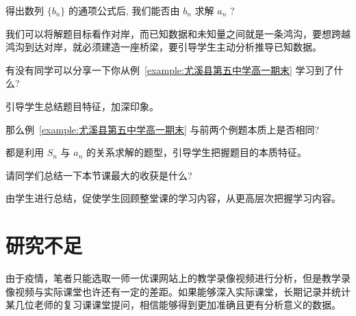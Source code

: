 \begin{question}
  得出数列 $\{b_{n}\}$ 的通项公式后, 我们能否由 $b_{n}$ 求解 $a_{n}$ ?
\end{question}

\begin{designgoal}
  我们可以将解题目标看作对岸，而已知数据和未知量之间就是一条鸿沟，要想跨越鸿沟到达对岸，就必须建造一座桥梁，要引导学生主动分析推导已知数据。
\end{designgoal}

\begin{question}
  有没有同学可以分享一下你从例~\ref{example:尤溪县第五中学高一期末} 学习到了什么?
\end{question}

\begin{designgoal}
  引导学生总结题目特征，加深印象。
\end{designgoal}

\begin{question}
  那么例~\ref{example:尤溪县第五中学高一期末} 与前两个例题本质上是否相同?
\end{question}

\begin{designgoal}
  都是利用 $S_n$ 与 $a_n$ 的关系求解的题型，引导学生把握题目的本质特征。
\end{designgoal}

\begin{question}
  请同学们总结一下本节课最大的收获是什么?
\end{question}

\begin{designgoal}
  由学生进行总结，促使学生回顾整堂课的学习内容，从更高层次把握学习内容。
\end{designgoal}



\section{研究不足}

由于疫情，笔者只能选取一师一优课网站上的教学录像视频进行分析，但是教学录像视频与实际课堂也许还有一定的差距。如果能够深入实际课堂，长期记录并统计某几位老师的复习课课堂提问，相信能够得到更加准确且更有分析意义的数据。